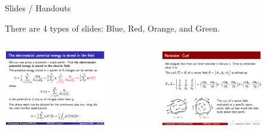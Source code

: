 \begin{frame}{Slides / Handouts}

There are 4 types of slides:
{\color{darkpowderblue} Blue}, {\color{dBG1} Red},
{\color{eBG1} Orange}, and {\color{pBG1} Green}.

\begin{columns}
  \begin{column}{0.50\textwidth}
   \begin{center}
     \includegraphics[width=0.7\textwidth]{./images/example_slides/main.png}\\
   \end{center}
  \end{column}
  \begin{column}{0.50\textwidth}
   \begin{center}
     \includegraphics[width=0.7\textwidth]{./images/example_slides/reminder.png}\\
   \end{center}
  \end{column}
\end{columns}


\end{frame}
